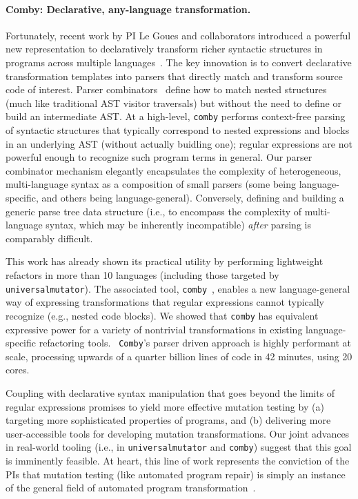 \paragraph{Comby: Declarative, any-language transformation.} Fortunately, recent work by PI
Le Goues and collaborators introduced a powerful new representation to
declaratively transform richer syntactic structures in programs across multiple
languages~\cite{rvt-ppc}. The key innovation is to convert declarative
transformation templates into parsers that directly match and transform source
code of interest. Parser
combinators~\cite{Hutton96monadicparser} define how to match nested structures (much like traditional AST
visitor traversals) but without the need to define or build an intermediate AST.
At a high-level, {\tt comby} performs
context-free
parsing of syntactic structures that typically correspond to nested
expressions and blocks in an underlying AST (without actually buidling one); regular expressions are not powerful enough to recognize such program terms in general. 
Our parser combinator mechanism elegantly encapsulates the complexity of
heterogeneous, multi-language syntax as a composition of small parsers (some
being language-specific, and others being language-general). Conversely, defining and
building a generic parse tree data structure (i.e., to encompass the complexity
of multi-language syntax, which may be inherently incompatible)
\emph{after} parsing is comparably difficult.

This work has already shown its practical utility by performing lightweight
refactors in more than 10 languages (including those targeted by {\tt
  universalmutator}). The associated tool, {\tt comby}~\cite{comby-github},
enables a new language-general way of expressing transformations that regular
expressions cannot typically recognize (e.g., nested code blocks). We showed
that {\tt comby} has equivalent expressive power for a variety of nontrivial 
transformations in existing language-specific refactoring tools. {\tt
  Comby}'s parser driven approach is
highly performant at scale, processing
upwards of a quarter billion lines of code in 42 minutes, using 20 cores.

Coupling with declarative syntax manipulation that goes beyond the limits
of regular expressions  promises to yield more effective mutation testing by (a) targeting more
sophisticated properties of programs, and (b) delivering more user-accessible
tools for developing mutation transformations. Our joint advances in
real-world tooling (i.e., in {\tt universalmutator} and {\tt comby}) suggest that
this goal is imminently feasible.  At heart, this line of work
represents the conviction of the PIs that mutation testing (like
automated program repair) is simply
an instance of the general field of automated program
transformation~\cite{Ptransform}.

